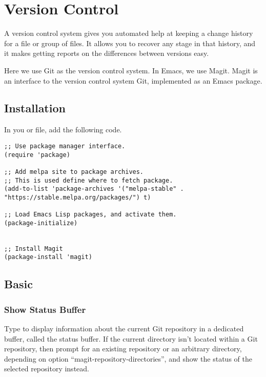 
\chapter{Version Control}
\label{cha:version-control}



A version control system gives you automated help at keeping a change history for a file or group of files.
It allows you to recover any stage in that history, and it makes getting reports on the differences between versions easy.


Here we use Git as the version control system.
In Emacs, we use Magit.
Magit is an interface to the version control system Git, implemented as an Emacs package.


\section{Installation}
\label{sec:installation-1}
In you  or  file, add the following code.

\begin{lstlisting}
;; Use package manager interface.
(require 'package)

;; Add melpa site to package archives.
;; This is used define where to fetch package. 
(add-to-list 'package-archives '("melpa-stable" . "https://stable.melpa.org/packages/") t)

;; Load Emacs Lisp packages, and activate them.
(package-initialize)


;; Install Magit
(package-install 'magit)
\end{lstlisting}

\section{Basic}
\label{sec:basic}

\subsection{Show Status Buffer}
\label{sec:show-status-buffer}


Type  to display information about the current Git repository in a dedicated buffer, called the status buffer. If the current directory isn’t located within a Git repository, then prompt for an existing repository or an arbitrary directory, depending on option ``magit-repository-directories'', and show the status of the selected repository instead.

